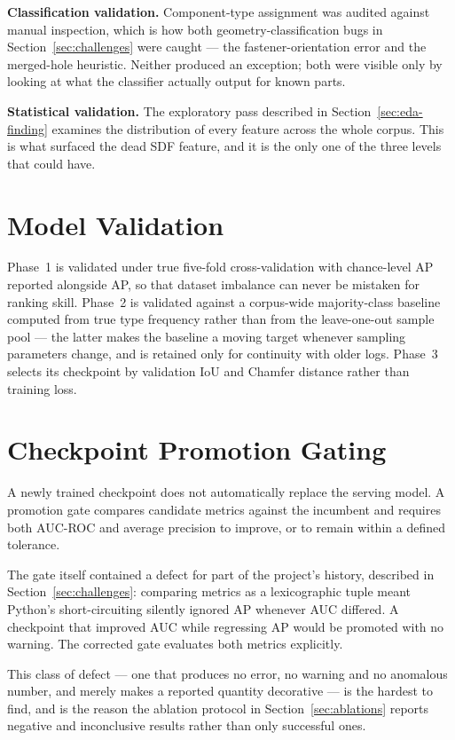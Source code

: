 \documentclass[12pt,oneside,a4paper]{report}
\begin{document}
\textbf{Classification validation.} Component-type assignment was audited
against manual inspection, which is how both geometry-classification bugs in
Section~\ref{sec:challenges} were caught --- the fastener-orientation error and
the merged-hole heuristic. Neither produced an exception; both were visible
only by looking at what the classifier actually output for known parts.

\textbf{Statistical validation.} The exploratory pass described in
Section~\ref{sec:eda-finding} examines the distribution of every feature across
the whole corpus. This is what surfaced the dead SDF feature, and it is the
only one of the three levels that could have.

\section{Model Validation}

Phase~1 is validated under true five-fold cross-validation with chance-level AP
reported alongside AP, so that dataset imbalance can never be mistaken for
ranking skill. Phase~2 is validated against a corpus-wide majority-class
baseline computed from true type frequency rather than from the leave-one-out
sample pool --- the latter makes the baseline a moving target whenever sampling
parameters change, and is retained only for continuity with older logs. Phase~3
selects its checkpoint by validation IoU and Chamfer distance rather than
training loss.

\section{Checkpoint Promotion Gating}

A newly trained checkpoint does not automatically replace the serving model. A
promotion gate compares candidate metrics against the incumbent and requires
both AUC-ROC and average precision to improve, or to remain within a defined
tolerance.

The gate itself contained a defect for part of the project's history, described
in Section~\ref{sec:challenges}: comparing metrics as a lexicographic tuple
meant Python's short-circuiting silently ignored AP whenever AUC differed. A
checkpoint that improved AUC while regressing AP would be promoted with no
warning. The corrected gate evaluates both metrics explicitly.

This class of defect --- one that produces no error, no warning and no
anomalous number, and merely makes a reported quantity decorative --- is the
hardest to find, and is the reason the ablation protocol in
Section~\ref{sec:ablations} reports negative and inconclusive results rather
than only successful ones.
\end{document}
